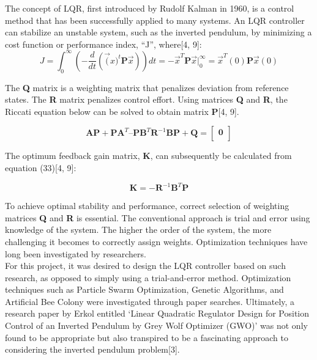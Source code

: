 \documentclass[titlepage]{article}
\begin{document}
The concept of LQR, first introduced by Rudolf Kalman in 1960, is a control method that has been successfully applied to many systems. An LQR controller can stabilize an unstable system, such as the inverted pendulum, by minimizing a cost function or performance index, “J”, where[4, 9]:
\begin{equation}
J = \int_{0}^{\infty} \left( -\frac{d}{dt}\left(\vec(x)^{t}\textbf{P}\vec{x}\right)\right)dt = -\vec{x}^{T}\textbf{P}\vec{x}\biggr\rvert_{0}^{\infty}=\vec{x}^{T}\left(0\right)\textbf{P}\vec{x}\left(0\right)
\end{equation}

The \textbf{Q} matrix is a weighting matrix that penalizes deviation from reference states. The \textbf{R} matrix penalizes control effort. Using matrices \textbf{Q} and \textbf{R}, the Riccati equation below can be solved to obtain matrix \textbf{P}[4, 9].

\begin{equation}
\textbf{A}\textbf{P} + \textbf{P}\textbf{A}^{T} – \textbf{P}\textbf{B}^{T}\textbf{R}^{-1}\textbf{B}\textbf{P} + \textbf{Q} = \begin{bmatrix} \textbf{0}\\\end{bmatrix}
\end{equation}

The optimum feedback gain matrix, \textbf{K}, can subsequently be calculated from equation (33)[4, 9]:

\begin{equation}
\textbf{K} = -\textbf{R}^{-1}\textbf{B}^{T}\textbf{P}
\end{equation}

To achieve optimal stability and performance, correct selection of weighting matrices \textbf{Q} and \textbf{R} is essential. The conventional approach is trial and error using knowledge of the system. The higher the order of the system, the more challenging it becomes to correctly assign weights. Optimization techniques have long been investigated by researchers.\\

For this project, it was desired to design the LQR controller based on such research, as opposed to simply using a trial-and-error method. Optimization techniques such as Particle Swarm Optimization, Genetic Algorithms, and Artificial Bee Colony were investigated through paper searches. Ultimately, a research paper by Erkol entitled ‘Linear Quadratic Regulator Design for Position Control of an Inverted Pendulum by Grey Wolf Optimizer (GWO)’ was not only found to be appropriate but also transpired to be a fascinating approach to considering the inverted pendulum problem[3].\\
\end{document}
